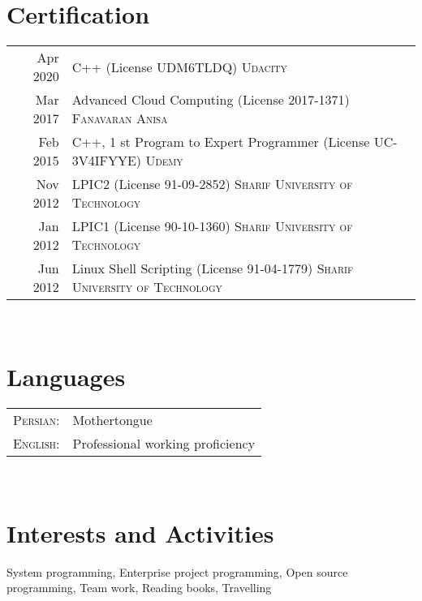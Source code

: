 \documentclass[a4paper,11pt]{article}
\begin{document}
\section{Certification}
\begin{tabular}{rp{12cm}}

    \textsc{} Apr 2020 & C++ (License UDM6TLDQ) \textsc{Udacity}\\
    \textsc{} Mar 2017 & Advanced Cloud Computing (License 2017-1371) \textsc{Fanavaran Anisa}\\
    \textsc{} Feb 2015 & C++, 1 st Program to Expert Programmer (License UC-3V4IFYYE) \textsc{Udemy}\\
    \textsc{} Nov 2012 & LPIC2 (License 91-09-2852) \textsc{Sharif University of Technology}\\
    \textsc{} Jan 2012 & LPIC1 (License 90-10-1360) \textsc{Sharif University of Technology}\\
    \textsc{} Jun 2012 & Linux Shell Scripting (License 91-04-1779) \textsc{Sharif University of Technology}\\

\end{tabular}\\

\section{Languages}
\begin{tabular}{rl}

    \textsc{Persian:} & Mothertongue\\
    \textsc{English:} & Professional working proficiency\\

\end{tabular}\\

\section{Interests and Activities}

    System programming,
    Enterprise project programming,
    Open source programming,
    Team work,
    Reading books,
    Travelling
\end{document}

